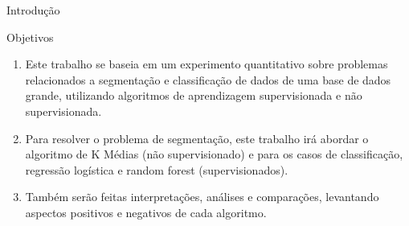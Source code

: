\documentclass[final,hyperref={pdfpagelabels=false}]{beamer}
\begin{document}
\begin{frame}[t]
\begin{columns}[t]
\begin{column}{.465\textwidth}
\begin{block}{Introdu\c c\~ao}
\end{block}



\begin{block}{Objetivos}

\begin{enumerate}
\item Este trabalho se baseia em um experimento quantitativo sobre problemas relacionados a segmentação e classificação de dados de uma base de dados grande, utilizando algoritmos de aprendizagem supervisionada e não supervisionada.
\item Para resolver o problema de segmentação, este trabalho irá abordar o algoritmo de K Médias (não supervisionado) e para os casos de classificação, regressão logística e random forest (supervisionados).
\item Também serão feitas interpretações, análises e comparações, levantando aspectos positivos e negativos de cada algoritmo.
\end{enumerate}

\end{block}






\end{column}
\end{columns}
\end{frame}
\end{document}
